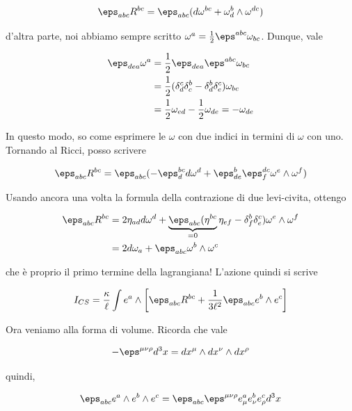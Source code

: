 \documentclass{report}
\begin{document}
\begin{align}
    \eps_{abc}R^{bc} = \eps_{abc}(d\omega^{bc} + \omega^b_d \wedge \omega^{dc})
\end{align}

d'altra parte, noi abbiamo sempre scritto \(\omega^a = \frac{1}{2}\eps^{abc}\omega_{bc}\). Dunque, vale 

\begin{align}
    \eps_{dea}\omega^a &= \frac{1}{2}\eps_{dea}\eps^{abc}\omega_{bc} \\
    &= \frac{1}{2}(\delta^c_d \delta^b_c - \delta^b_d \delta^c_e)\omega_{bc} \\
    &= \frac{1}{2}\omega_{ed} - \frac{1}{2}\omega_{de} = -\omega_{de}
\end{align}

In questo modo, so come esprimere le \(\omega\) con due indici in termini di \(\omega\) con uno. Tornando al Ricci, posso scrivere 

\begin{align}
    \eps_{abc}R^{bc} = \eps_{abc}(-\eps^{bc}_d d\omega^d + \eps^{b}_{de} \eps^{dc}_f\omega^e \wedge \omega^f)
\end{align}

Usando ancora una volta la formula della contrazione di due levi-civita, ottengo 

\begin{align}
    \eps_{abc}R^{bc} &= 2\eta_{ad}d\omega^d + \underbrace{\eps_{abc}(\eta^{bc}}_{=0}\eta_{ef} - \delta^b_f \delta^c_e)\omega^e \wedge \omega ^f  \\
    &= 2 d\omega_a + \eps_{abc} \omega^b \wedge \omega^c
\end{align}

che è proprio il primo termine della lagrangiana! L'azione quindi si scrive 

\begin{align}
    I_{CS} = \frac{\kappa}{\ell}\int e^a \wedge \left[\eps_{abc}R^{bc} + \frac{1}{3\ell^2} \eps_{abc}e^b \wedge e^c\right]
\end{align}

Ora veniamo alla forma di volume. Ricorda che vale 

\begin{align}
    -\eps^{\mu\nu\rho}d^3x = dx^\mu \wedge dx^\nu \wedge dx^\rho 
\end{align}

quindi, 

\begin{align}
    \eps_{abc} e^a \wedge e^b \wedge e^c = \eps_{abc}\eps^{\mu\nu\rho}e^a_\mu e^b_\nu e^c_\rho d^3x 
\end{align}
\end{document}
